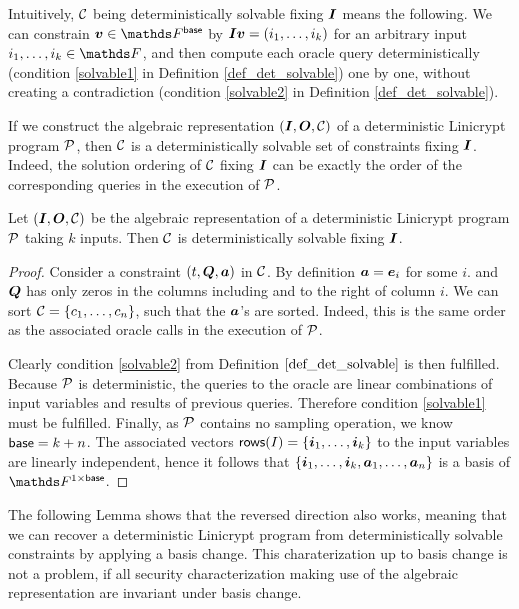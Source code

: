 Intuitively, $\C$ being deterministically solvable fixing $\I$ means the following.
We can constrain $\vv \in \Fsp$ by $\Inp \vv = (i_1, \dots, i_k)$ for an arbitrary input $i_1, \dots, i_k \in \F$,
and then compute each oracle query deterministically (condition \ref{solvable1} in Definition \ref{def_det_solvable}) one by one,
without creating a contradiction (condition \ref{solvable2} in Definition \ref{def_det_solvable}).

If we construct the algebraic representation $(\I, \O, \C)$ of a deterministic Linicrypt program $\P$,
then $\C$ is a deterministically solvable set of constraints fixing $\I$.
Indeed, the solution ordering of $\C$ fixing $\I$
can be exactly the order of the corresponding queries in the execution of $\P$.

\begin{lemma}
\label{alg_rep_det_solvable}
    Let $(\I, \O, \C)$ be the algebraic representation of a deterministic Linicrypt program $\P$ taking $k$ inputs.
    Then $\C$ is deterministically solvable fixing $\I$.
\end{lemma}

\begin{proof}
    Consider a constraint $(t, \Q, \va)$ in $\C$.
    By definition $\va = \ve_i$ for some $i$.
    and $\Q$ has only zeros in the columns including and to the right of column $i$.
    We can sort $\C = \{\dts c n\}$, such that the $\va$'s are sorted.
    Indeed, this is the same order as the associated oracle calls in the execution of $\P$.
    
    Clearly condition \ref{solvable2} from Definition $\ref{def_det_solvable}$ is then fulfilled.
    Because $\P$ is deterministic, 
    the queries to the oracle are linear combinations of input variables and results of previous queries.
    Therefore condition \ref{solvable1} must be fulfilled.
    Finally, as $\P$ contains no sampling operation, we know $\base = k + n$.
    The associated vectors $\rows(I) = \{ \dts \vi k \}$ to the input variables are linearly independent,
    hence it follows that $\{ \dts \vi k, \dts \va n \}$ is a basis of $\F^{1\times\base}$. 
\end{proof}

The following Lemma shows that the reversed direction also works,
meaning that we can recover a deterministic Linicrypt program from deterministically solvable constraints by applying a basis change.
This charaterization up to basis change is not a problem, 
if all security characterization making use of the algebraic representation are invariant under basis change.

